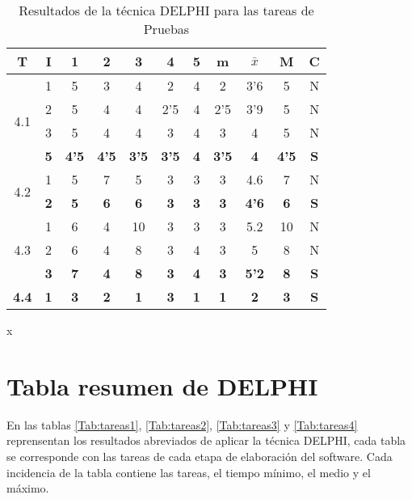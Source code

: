 \documentclass[11pt,a4paper,spanish,twoside]{report}
\begin{document}
\begin{table}[!h]
\centering
  \begin{tabular}{|c|c||c|c|c|c|c||c|c|c||c|}
    \hline
    \textbf{T} & \textbf{I} & \textbf{1} &
    \textbf{2} & \textbf{3} & \textbf{4} & \textbf{5} & \textbf{m}
    &\textbf{$\bar{x}$} &\textbf{M} & \textbf{C}\\    
    \hline \hline
    \multirow{4}{*}{4.1}& 1 & 5 & 3 & 4 & 2 & 4 & 2 & 3'6 & 5 & N \\
    & 2 & 5 & 4 & 4 & 2'5 & 4 & 2'5 & 3'9 & 5 & N \\
    & 3 & 5 & 4 & 4 & 3 & 4 & 3 & 4 & 5 & N \\
    & \textbf{5} & \textbf{4'5} & \textbf{4'5} & \textbf{3'5} & \textbf{3'5} & \textbf{4} & \textbf{3'5} & \textbf{4} & \textbf{4'5} & \textbf{S} \\    
    \hline
    
    \multirow{2}{*}{4.2}& 1 & 5 & 7 & 5 & 3 & 3 & 3 & 4.6 & 7 & N \\
    & \textbf{2} & \textbf{5} & \textbf{6} & \textbf{6} & \textbf{3} & \textbf{3} & \textbf{3} & \textbf{4'6} & \textbf{6} & \textbf{S} \\
    \hline
    \multirow{3}{*}{4.3}& 1 & 6 & 4 & 10 & 3 & 3 & 3 & 5.2 & 10 & N \\
    & 2 & 6 & 4 & 8 & 3 & 4 & 3 & 5 & 8 & N \\
    & \textbf{3} & \textbf{7} & \textbf{4} & \textbf{8} & \textbf{3} & \textbf{4} & \textbf{3} & \textbf{5'2} & \textbf{8} & \textbf{S} \\
    \hline
    \textbf{4.4} & \textbf{1} & \textbf{3} & \textbf{2} & \textbf{1} & \textbf{3} & \textbf{1} & \textbf{1} & \textbf{2} & \textbf{3} & \textbf{S} \\
    \hline
  \end{tabular}
  \caption{Resultados de la técnica DELPHI para las tareas de Pruebas} x\label{Tab:pru}
\end{table} 
\section{Tabla resumen de DELPHI}
En las tablas \ref{Tab:tareas1}, \ref{Tab:tareas2}, \ref{Tab:tareas3} y
\ref{Tab:tareas4} reprensentan los resultados abreviados de aplicar la
técnica DELPHI, cada tabla se corresponde con las tareas de cada etapa de
elaboración del software. Cada incidencia de la tabla contiene las tareas, el
tiempo mínimo, el medio y el máximo.
\end{document}
